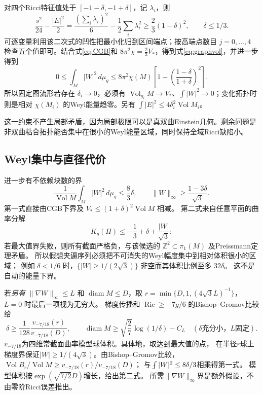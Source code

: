 \documentclass[UTF8,a4paper,11pt,fontset=fandol]{ctexart}
\numberwithin{equation}{section}
\theoremstyle{definition}
\newcommand{\Ric}{\operatorname{Ric}}
\newcommand{\Vol}{\operatorname{Vol}}
\newcommand{\diam}{\operatorname{diam}}
\newcommand{\dd}{\,d\mu_g}
\newcommand{\fint}{\mathop{\rlap{\,\raisebox{0.1ex}{\tiny$-$}}\int}\nolimits}
\begin{document}
对四个Ricci特征值处于 $[-1-\delta,-1+\delta]$，记 $\lambda_i$，则
\[
\frac{s^2}{24}-\frac{|E|^2}{2}
=\frac{(\sum_i\lambda_i)^2}{6}-\frac12\sum_i\lambda_i^2
\ge\frac23(1-\delta)^2,\qquad\delta\le1/3.
\]
可逐变量利用该二次式的凹性把最小化归到区间端点；按高端点数目 $j=0,\dots,4$ 检查五个值即可。结合式\eqref{eq:CGB}和 $8\pi^2\chi=\frac23V_*$，得到式\eqref{eq:graphvol}，并进一步得到
\begin{equation}\label{eq:graphW}
\boxed{0\le\int_M|W|^2\dd\le8\pi^2\chi(M)
\left[1-\left(\frac{1-\delta}{1+\delta}\right)^2\right].}
\end{equation}
所以固定图流形若存在 $\delta_i\to0$，必须有 $\Vol_{g_i}M\to V_*$、$\int|W|^2\to0$；变化拓扑时则是相对 $\chi(M_i)$ 的Weyl能量趋零。另有 $\int|E|^2\le4\delta_i^2\Vol M_i$。

这一约束不产生局部矛盾，因为局部极限可以是真双曲Einstein几何。剩余问题是非双曲粘合拓扑能否集中在很小的Weyl能量区域，同时保持全域Ricci缺陷小。

\subsection{Weyl集中与直径代价}
进一步有不依赖块数的界
\begin{equation}\label{eq:graphconcentration}
 \frac1{\Vol M}\int_M|W|^2\dd\le\frac83\delta,
 \qquad \|W\|_\infty\ge\frac{1-3\delta}{\sqrt3}.
\end{equation}
第一式直接由CGB下界及 $V_*\le(1+\delta)^2\Vol M$ 相减。
第二式来自任意平面的曲率分解
\[
 K_g(\Pi)\le-\frac13+\delta+\frac{|W|}{\sqrt3}:
\]
若最大值界失败，则所有截面严格负，与该候选的
$\mathbb Z^2\subset\pi_1(M)$ 及Preissmann定理矛盾。
所以假想夹逼序列必须把不可消失的Weyl幅度集中到相对体积很小的区域；
例如 $\delta<1/6$ 时，$\{|W|\ge1/(2\sqrt3)\}$ 非空而其体积比例至多 $32\delta$。
这不是自动的能量下界。

若\emph{另有} $\|\nabla W\|_\infty\le L$ 和 $\diam M\le D$，取
$r=\min\{D,1,(4\sqrt3L)^{-1}\}$，$L=0$ 时最后一项视为无穷大。
梯度传播和 $\Ric\ge-7g/6$ 的Bishop--Gromov比较给
\begin{equation}\label{eq:graphdiameter}
 \delta\ge\frac1{128}\frac{v_{-7/18}(r)}{v_{-7/18}(D)},
 \qquad \diam M\ge\sqrt{\frac27}\log(1/\delta)-C_L
 \quad(\delta\text{充分小，}L\text{固定}).
\end{equation}
$v_{-7/18}$为四维常截面曲率模型球体积。具体地，取达到最大值的点，
在半径$r$球上梯度界保证$|W|\ge1/(4\sqrt3)$。由Bishop--Gromov比较，
$\Vol B_r/\Vol M\ge v_{-7/18}(r)/v_{-7/18}(D)$；
与$\fint|W|^2\le8\delta/3$相乘得第一式。
模型体积按$\exp(\sqrt{7/2}D)$增长，给出第二式。
所需$\|\nabla W\|_\infty$界是额外假设，不由零阶Ricci误差推出。
\end{document}
